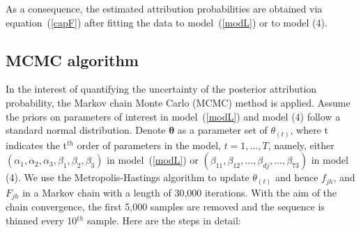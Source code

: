 \documentclass[times, doublespace]{WileyNJD-v2}%
\begin{document}
As a consequence, the estimated attribution probabilities are obtained via equation~(\ref{capF}) after fitting the data to model~(\ref{modL}) or to model (4).

\subsection{MCMC algorithm}
In the interest of quantifying the uncertainty of the posterior attribution probability, the Markov chain Monte Carlo (MCMC) method is applied. Assume the priors on parameters of interest in model~(\ref{modL}) and model (4) follow a standard normal distribution. Denote $\boldsymbol{\theta}$ as a parameter set of $\theta_{(t)}$, where t indicates the t$^{th}$ order of parameters in the model, $t=1, \ldots, T$, namely, either $(\alpha_1, \alpha_2, \alpha_3, \beta_1, \beta_2, \beta_3)$ in model~(\ref{modL}) or $(\beta_{11}, \beta_{12}, \ldots, \beta_{dj}, \ldots, \beta_{73})$ in model (4). We use the Metropolis-Hastings algorithm to update $\theta_{(t)}$ and hence $f_{jh}$, and $ F_{jh}$ in a Markov chain with a length of 30,000 iterations. With the aim of the chain convergence, the first 5,000 samples are removed and the sequence is thinned every 10$^{th}$ sample. Here are the steps in detail:
\end{document}
